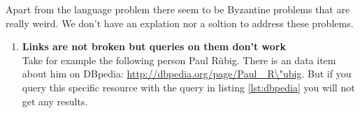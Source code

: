 Apart from the language problem there seem to be Byzantine problems that are really weird. We don't have an explation nor a soltion to address these problems.

\begin{enumerate}
\item \textbf{Links are not broken but queries on them don't work}\\
Take for example the following person Paul Rübig. There is an data item about him on DBpedia:  \url{http://dbpedia.org/page/Paul\_ R\"ubig}. But if you query this specific resource with the query in listing \ref{lst:dbpedia} you will not get any results.

\end{enumerate}